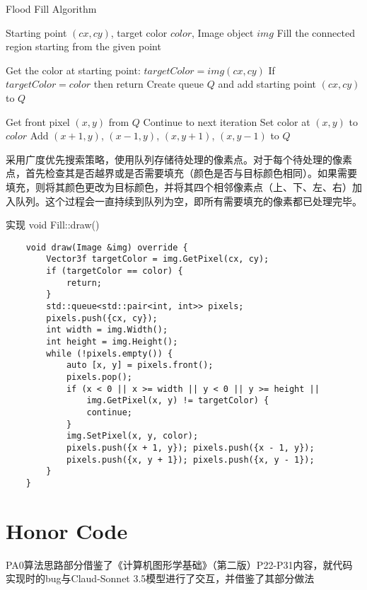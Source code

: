 \documentclass[a4paper,twoside]{article}
\begin{document}
\begin{algorithm}[H]
    \caption{Flood Fill Algorithm}
    \label{alg:flood_fill}
    \begin{algorithmic}[1]
        \REQUIRE Starting point $(cx, cy)$, target color $color$, Image object $img$
        \ENSURE Fill the connected region starting from the given point

        \STATE Get the color at starting point: $targetColor = img(cx, cy)$
        \STATE If $targetColor = color$ then return
        \STATE Create queue $Q$ and add starting point $(cx, cy)$ to $Q$
        
            \STATE Get front pixel $(x, y)$ from $Q$
                \STATE Continue to next iteration
            \ENDIF
            \STATE Set color at $(x, y)$ to $color$
            \STATE Add $(x+1, y)$, $(x-1, y)$, $(x, y+1)$, $(x, y-1)$ to $Q$
        \ENDWHILE
    \end{algorithmic}
\end{algorithm}
采用广度优先搜索策略，使用队列存储待处理的像素点。对于每个待处理的像素点，首先检查其是否越界或是否需要填充（颜色是否与目标颜色相同）。如果需要填充，则将其颜色更改为目标颜色，并将其四个相邻像素点（上、下、左、右）加入队列。这个过程会一直持续到队列为空，即所有需要填充的像素都已处理完毕。
\begin{listing}[H]
    \caption{实现 void Fill::draw()}
    \label{code:fill_draw}
    \begin{verbatim}
    void draw(Image &img) override {
        Vector3f targetColor = img.GetPixel(cx, cy);
        if (targetColor == color) {
            return;
        }
        std::queue<std::pair<int, int>> pixels;
        pixels.push({cx, cy});
        int width = img.Width();
        int height = img.Height();
        while (!pixels.empty()) {
            auto [x, y] = pixels.front();
            pixels.pop();
            if (x < 0 || x >= width || y < 0 || y >= height ||
                img.GetPixel(x, y) != targetColor) {
                continue;
            }
            img.SetPixel(x, y, color);
            pixels.push({x + 1, y}); pixels.push({x - 1, y}); 
            pixels.push({x, y + 1}); pixels.push({x, y - 1}); 
        }
    }
    \end{verbatim}
\end{listing}

\section{Honor Code}
PA0算法思路部分借鉴了《计算机图形学基础》（第二版）P22-P31内容，就代码实现时的bug与Claud-Sonnet 3.5模型进行了交互，并借鉴了其部分做法
\end{document}
